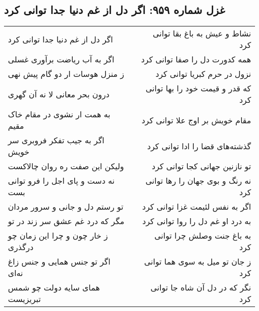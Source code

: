 \begin{center}
\section*{غزل شماره ۹۵۹: اگر دل از غم دنیا جدا توانی کرد}
\label{sec:0959}
\begin{longtable}{l p{0.5cm} r}
اگر دل از غم دنیا جدا توانی کرد
&&
نشاط و عیش به باغ بقا توانی کرد
\\
اگر به آب ریاضت برآوری غسلی
&&
همه کدورت دل را صفا توانی کرد
\\
ز منزل هوسات ار دو گام پیش نهی
&&
نزول در حرم کبریا توانی کرد
\\
درون بحر معانی لا نه آن گهری
&&
که قدر و قیمت خود را بها توانی کرد
\\
به همت ار نشوی در مقام خاک مقیم
&&
مقام خویش بر اوج علا توانی کرد
\\
اگر به جیب تفکر فروبری سر خویش
&&
گذشته‌های قضا را ادا توانی کرد
\\
ولیکن این صفت ره روان چالاکست
&&
تو نازنین جهانی کجا توانی کرد
\\
نه دست و پای اجل را فرو توانی بست
&&
نه رنگ و بوی جهان را رها توانی کرد
\\
تو رستم دل و جانی و سرور مردان
&&
اگر به نفس لئیمت غزا توانی کرد
\\
مگر که درد غم عشق سر زند در تو
&&
به درد او غم دل را روا توانی کرد
\\
ز خار چون و چرا این زمان چو درگذری
&&
به باغ جنت وصلش چرا توانی کرد
\\
اگر تو جنس همایی و جنس زاغ نه‌ای
&&
ز جان تو میل به سوی هما توانی کرد
\\
همای سایه دولت چو شمس تبریزیست
&&
نگر که در دل آن شاه جا توانی کرد
\\
\end{longtable}
\end{center}
